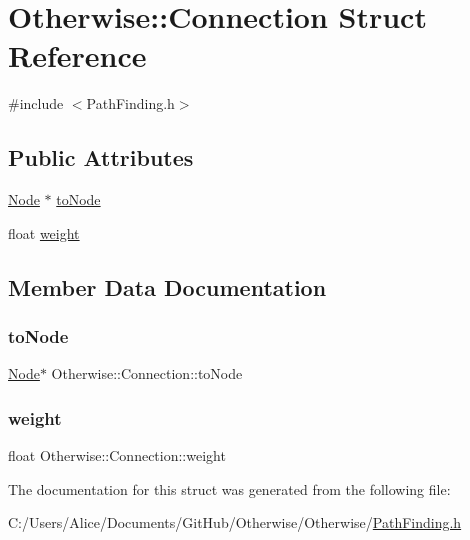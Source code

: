 \hypertarget{struct_otherwise_1_1_connection}{}\section{Otherwise\+:\+:Connection Struct Reference}
\label{struct_otherwise_1_1_connection}


{\ttfamily \#include $<$Path\+Finding.\+h$>$}

\subsection*{Public Attributes}
\begin{DoxyCompactItemize}
\item 
\hyperlink{struct_otherwise_1_1_node}{Node} $\ast$ \hyperlink{struct_otherwise_1_1_connection_a1917e716139e0962f93e5e38a35c1cd8}{to\+Node}
\item 
float \hyperlink{struct_otherwise_1_1_connection_aa8979f864f965f087364565e29d821d6}{weight}
\end{DoxyCompactItemize}


\subsection{Member Data Documentation}
\mbox{\label{struct_otherwise_1_1_connection_a1917e716139e0962f93e5e38a35c1cd8}} 
\subsubsection{\texorpdfstring{to\+Node}{toNode}}
{\footnotesize\ttfamily \hyperlink{struct_otherwise_1_1_node}{Node}$\ast$ Otherwise\+::\+Connection\+::to\+Node}

\mbox{\label{struct_otherwise_1_1_connection_aa8979f864f965f087364565e29d821d6}} 
\subsubsection{\texorpdfstring{weight}{weight}}
{\footnotesize\ttfamily float Otherwise\+::\+Connection\+::weight}



The documentation for this struct was generated from the following file\+:\begin{DoxyCompactItemize}
\item 
C\+:/\+Users/\+Alice/\+Documents/\+Git\+Hub/\+Otherwise/\+Otherwise/\hyperlink{_path_finding_8h}{Path\+Finding.\+h}\end{DoxyCompactItemize}
